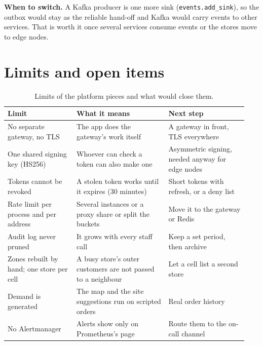 \textbf{When to switch.} A Kafka producer is one more sink (\texttt{events.add\_sink}), so the outbox would stay as
the reliable hand-off and Kafka would carry events to other services. That is worth it once several services
consume events or the stores move to edge nodes.

\section{Limits and open items}

\begin{table}[!htb]
  \centering
  \footnotesize
  \begin{tabular}{@{}>{\raggedright\arraybackslash}p{0.27\linewidth}>{\raggedright\arraybackslash}p{0.36\linewidth}
                  >{\raggedright\arraybackslash}p{0.31\linewidth}@{}}
    \toprule
    Limit & What it means & Next step \\
    \midrule
    No separate gateway, no TLS & The app does the gateway's work itself & A gateway in front, TLS everywhere \\
    \addlinespace[3pt]
    One shared signing key (HS256) & Whoever can check a token can also make one & Asymmetric signing, needed
      anyway for edge nodes \\
    \addlinespace[3pt]
    Tokens cannot be revoked & A stolen token works until it expires (30 minutes) & Short tokens with refresh, or a
      deny list \\
    \addlinespace[3pt]
    Rate limit per process and per address & Several instances or a proxy share or split the buckets & Move it to
      the gateway or Redis \\
    \addlinespace[3pt]
    Audit log never pruned & It grows with every staff call & Keep a set period, then archive \\
    \addlinespace[3pt]
    Zones rebuilt by hand; one store per cell & A busy store's outer customers are not passed to a neighbour & Let a
      cell list a second store \\
    \addlinespace[3pt]
    Demand is generated & The map and the site suggestions run on scripted orders & Real order history \\
    \addlinespace[3pt]
    No Alertmanager & Alerts show only on Prometheus's page & Route them to the on-call channel \\
    \bottomrule
  \end{tabular}
  \caption{Limits of the platform pieces and what would close them.}
  \label{tab:m4-limits}
\end{table}
